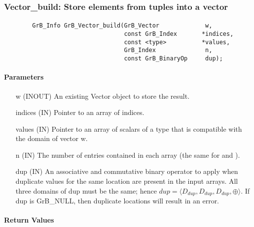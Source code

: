 
\subsubsection{{\sf Vector\_build}: Store elements from tuples into a vector }
\label{Sec:Vector_build}

\paragraph{\syntax}

\begin{verbatim}
        GrB_Info GrB_Vector_build(GrB_Vector             w,
                                  const GrB_Index       *indices,
                                  const <type>          *values,
                                  GrB_Index              n,
                                  const GrB_BinaryOp     dup);
\end{verbatim}

\paragraph{Parameters}

\begin{itemize}[leftmargin=1.1in]
    \item[{\sf w}]       ({\sf INOUT}) An existing Vector object to store the result.
    \item[{\sf indices}] ({\sf IN}) Pointer to an array of indices. 
    \item[{\sf values}]  ({\sf IN}) Pointer to an array of scalars of a type that
                                     is compatible with the domain of vector {\sf w}.
    \item[{\sf n}]       ({\sf IN}) The number of entries contained in each array (the same for  and ).
    \item[{\sf dup}]     ({\sf IN}) An associative and commutative binary operator 
    to apply when duplicate values for the same location are present in the input
    arrays. All three domains of {\sf dup} must be the same; hence
	    $dup=\langle D_{dup},D_{dup},D_{dup},\oplus \rangle$.
    If {\sf dup} is {\sf GrB\_NULL}, then duplicate locations will result in an error.  
\end{itemize}

\paragraph{Return Values}

